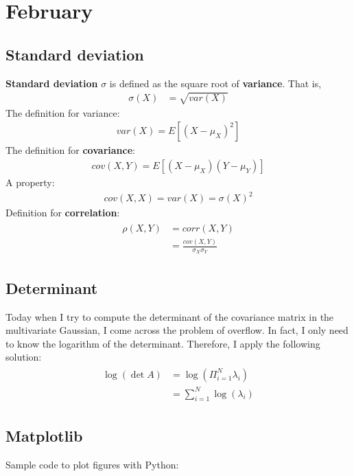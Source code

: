\chapter{February}

\section{Standard deviation} 
\textbf{Standard deviation} $\sigma$ is defined as the square root of \textbf{variance}. That is,
\begin{align}
	\sigma(X) &= \sqrt{var(X)}
\end{align}
The definition for variance:
\begin{align}
var(X) = E[(X - \mu_X)^2]
\end{align}
The definition for \textbf{covariance}:
\begin{align}
cov(X,Y) = E[(X - \mu_X)(Y- \mu_Y)]
\end{align}
A property:
\begin{align}
	cov(X,X) = var(X) = \sigma(X)^2 
\end{align}
Definition for \textbf{correlation}:
\begin{align}
	\begin{split}
	\rho(X,Y) & = corr(X, Y) 		\\
			  & = \frac{cov(X,Y)}{\sigma_X \sigma_Y}
	\end{split}
\end{align}


\section{Determinant}
Today when I try to compute the determinant of the covariance matrix in the multivariate Gaussian, I come across the problem of overflow. In fact, I only
need to know the logarithm of the determinant. Therefore, I apply the following solution:
\begin{align}
	\begin{split}
	\log(\det A) &= \log(\Pi_{i=1}^{N} \lambda_i)  \\
				 & = \sum_{i=1}^{N} \log(\lambda_i)
	\end{split}
\end{align}

\section{Matplotlib}
Sample code to plot figures with Python:

